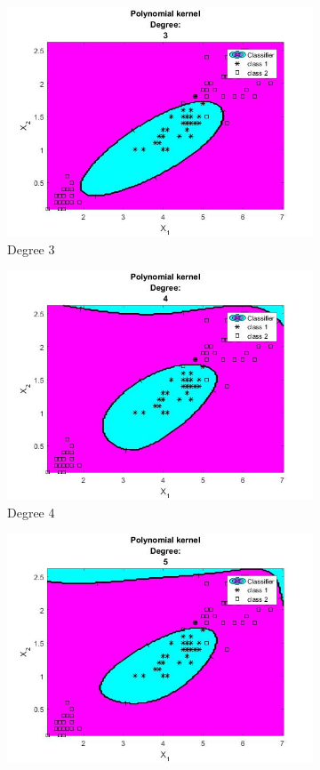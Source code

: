 \documentclass[11pt,oneside,a4paper]{article}
\begin{document}
\begin{figure}[H]
\begin{subfigure}[b]{0.4\textwidth}
		\includegraphics[width=\textwidth]{../Figures/poly_degree_3}
		\caption{Degree 3}
	\end{subfigure}
	\begin{subfigure}[b]{0.4\textwidth}
		\includegraphics[width=\textwidth]{../Figures/poly_degree_4}
		\caption{Degree 4}
	\end{subfigure}
	\begin{subfigure}[b]{0.4\textwidth}
	\includegraphics[width=\textwidth]{../Figures/poly_degree_5}

\end{subfigure}
\end{figure}
\end{document}
